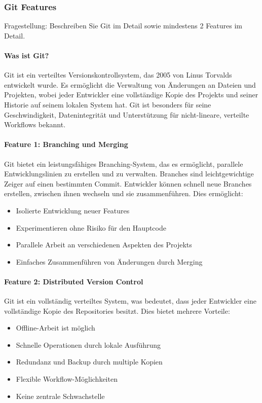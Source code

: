\subsubsection{Git Features}

Fragestellung: Beschreiben Sie Git im Detail sowie mindestens 2 Features im Detail.

\paragraph{Was ist Git?}
Git ist ein verteiltes Versionskontrollsystem, das 2005 von Linus Torvalds entwickelt wurde.
Es ermöglicht die Verwaltung von Änderungen an Dateien und Projekten,
wobei jeder Entwickler eine vollständige Kopie des Projekts und seiner Historie auf seinem lokalen System hat.
Git ist besonders für seine Geschwindigkeit, Datenintegrität und Unterstützung für nicht-lineare, verteilte 
Workflows bekannt. \cite{github-git}

\paragraph{Feature 1: Branching und Merging}
Git bietet ein leistungsfähiges Branching-System, das es ermöglicht, parallele Entwicklungslinien 
zu erstellen und zu verwalten. Branches sind leichtgewichtige Zeiger auf einen bestimmten Commit. 
Entwickler können schnell neue Branches erstellen, zwischen ihnen wechseln und sie zusammenführen. 
Dies ermöglicht:

    \begin{itemize}
        \item Isolierte Entwicklung neuer Features
        \item Experimentieren ohne Risiko für den Hauptcode
        \item Parallele Arbeit an verschiedenen Aspekten des Projekts
        \item Einfaches Zusammenführen von Änderungen durch Merging
    \end{itemize}

    \paragraph{Feature 2: Distributed Version Control}
    Git ist ein vollständig verteiltes System, was bedeutet, dass jeder Entwickler eine vollständige Kopie des Repositories besitzt.
    Dies bietet mehrere Vorteile:

    \begin{itemize}
        \item Offline-Arbeit ist möglich
        \item Schnelle Operationen durch lokale Ausführung
        \item Redundanz und Backup durch multiple Kopien
        \item Flexible Workflow-Möglichkeiten
        \item Keine zentrale Schwachstelle
    \end{itemize}




